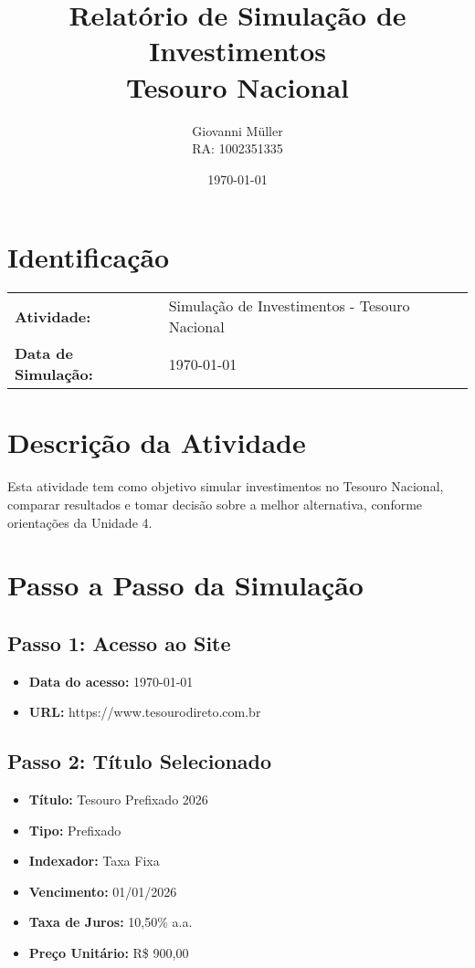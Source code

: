 \documentclass[12pt, a4paper]{article}
\title{Relatório de Simulação de Investimentos \\ Tesouro Nacional}
\author{Giovanni Müller \\ RA: 1002351335}
\date{\today}
\begin{document}
\maketitle

\section*{Identificação}
\begin{tabular}{ll}
\textbf{Atividade:} & Simulação de Investimentos - Tesouro Nacional \\
\textbf{Data de Simulação:} & \today \\
\end{tabular}

\section{Descrição da Atividade}

Esta atividade tem como objetivo simular investimentos no Tesouro Nacional, comparar resultados e tomar decisão sobre a melhor alternativa, conforme orientações da Unidade 4.

\section{Passo a Passo da Simulação}

\subsection*{Passo 1: Acesso ao Site}
\begin{itemize}
    \item \textbf{Data do acesso:} \today
    \item \textbf{URL:} https://www.tesourodireto.com.br
\end{itemize}


\subsection*{Passo 2: Título Selecionado}
\begin{itemize}
    \item \textbf{Título:} Tesouro Prefixado 2026
    \item \textbf{Tipo:} Prefixado
    \item \textbf{Indexador:} Taxa Fixa
    \item \textbf{Vencimento:} 01/01/2026
    \item \textbf{Taxa de Juros:} 10,50\% a.a.
    \item \textbf{Preço Unitário:} R\$ 900,00
\end{itemize}
\end{document}
